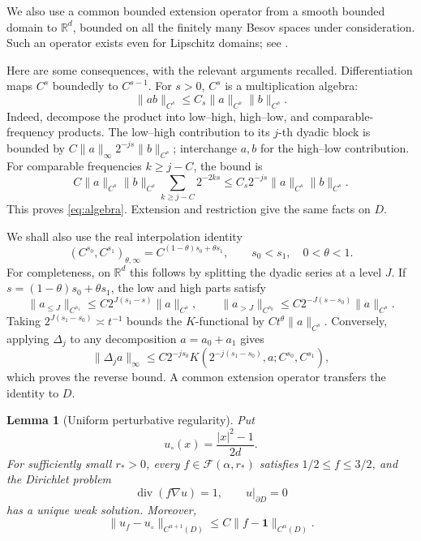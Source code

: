 \documentclass[11pt]{article}
\newtheorem{lemma}[theorem]{Lemma}
\theoremstyle{remark}
\newcommand{\R}{\mathbb R}
\newcommand{\one}{\mathbf 1}
\newcommand{\cF}{\mathcal F}
\DeclareMathOperator{\divergence}{div}
\begin{document}
We also use a common bounded extension operator from a smooth bounded
domain to \(\R^d\), bounded on all the finitely many Besov spaces under
consideration. Such an operator exists even for Lipschitz domains;
see \cite{Rychkov}.

Here are some consequences, with the relevant arguments recalled.
Differentiation maps \(C^s\) boundedly to \(C^{s-1}\).
For \(s>0\), \(C^s\) is a multiplication algebra:
\begin{equation}\label{eq:algebra}
\|ab\|_{C^s}\leq C_s\|a\|_{C^s}\|b\|_{C^s}.
\end{equation}
Indeed, decompose the product into low--high, high--low, and
comparable-frequency products. The low--high contribution to its
\(j\)-th dyadic block is bounded by
\(C\|a\|_\infty 2^{-js}\|b\|_{C^s}\); interchange \(a,b\) for
the high--low contribution. For comparable frequencies \(k\geq j-C\),
the bound is
\[
C\|a\|_{C^s}\|b\|_{C^s}
\sum_{k\geq j-C}2^{-2ks}
\leq C_s2^{-js}\|a\|_{C^s}\|b\|_{C^s}.
\]
This proves \eqref{eq:algebra}. Extension and restriction give the same
facts on \(D\).

We shall also use the real interpolation identity 
\begin{equation}\label{eq:interp}
(C^{s_0},C^{s_1})_{\theta,\infty}
=C^{(1-\theta)s_0+\theta s_1},
\qquad s_0<s_1,\quad 0<\theta<1.
\end{equation}
For completeness, on \(\R^d\) this follows by splitting the dyadic
series at a level \(J\). If \(s=(1-\theta)s_0+\theta s_1\), the low
and high parts satisfy
\[
\|a_{\leq J}\|_{C^{s_1}}
\leq C2^{J(s_1-s)}\|a\|_{C^s},\qquad
\|a_{>J}\|_{C^{s_0}}
\leq C2^{-J(s-s_0)}\|a\|_{C^s}.
\]
Taking \(2^{J(s_1-s_0)}\asymp t^{-1}\) bounds the \(K\)-functional
by \(Ct^\theta\|a\|_{C^s}\). Conversely, applying \(\Delta_j\) to
any decomposition \(a=a_0+a_1\) gives
\[
\|\Delta_j a\|_\infty
\leq C2^{-js_0}
K(2^{-j(s_1-s_0)},a;C^{s_0},C^{s_1}),
\]
which proves the reverse bound. A common extension operator transfers
the identity to \(D\).

\begin{lemma}[Uniform perturbative regularity]\label{lem:forward}
Put
\[
u_\circ(x)=\frac{|x|^2-1}{2d}.
\]
For sufficiently small \(r_*>0\), every
\(f\in\cF(\alpha,r_*)\) satisfies \(1/2\leq f\leq3/2\), and the
Dirichlet problem
\[
\divergence(f\nabla u)=1,\qquad u|_{\partial D}=0
\]
has a unique weak solution. Moreover,
\begin{equation}\label{eq:forward-reg}
\|u_f-u_\circ\|_{C^{\alpha+1}(D)}
\leq C\|f-\one\|_{C^\alpha(D)}.
\end{equation}
\end{lemma}
\end{document}
